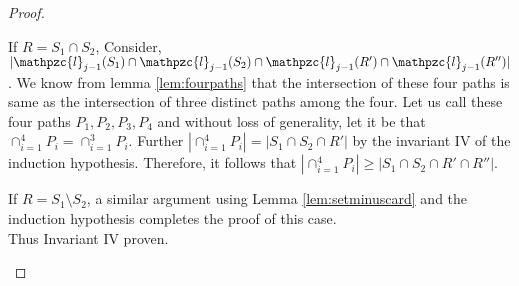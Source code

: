 \documentclass[a4paper,UKenglish,numberwithinsect]{lipics}
\def\cl{\mathpzc{l}}
\begin{document}
\begin{proof}
\begin{enumerate}
\begin{enumerate}
         If $R = S_1 \cap S_2$, Consider, $|\cl_{j-1}(S_1) \cap \cl_{j-1}(S_2) \cap \cl_{j-1}(R') \cap \cl_{j-1}(R'')|$. We know from lemma \ref{lem:fourpaths} that the intersection
of these four paths is same as the intersection of three distinct paths among the four.  
Let us call these four paths $P_1,P_2, P_3,P_4$ and without loss of generality, 
let it be that $\displaystyle \cap_{i=1}^4 P_i  = \cap_{i=1}^3 P_i$. Further $|\cap_{i=1}^4 P_i|=| S_1 \cap S_2 \cap R'|$ by the invariant IV of the induction hypothesis.  
Therefore, it follows that $|\cap_{i=1}^4 P_i| \geq |S_1 \cap S_2 \cap R' \cap R''|$.\\
\begin{comment}
 Next, we write $\displaystyle |\cap_{i=1}^4 P_i| = |P_4| + |\displaystyle \cap_{i=1}^3 P_i| - |P_4 \cup \cap_{i=1}^3 P_i|$. Clearly $\displaystyle P_4 \cup \cap_{i=1}^3 P_i = P_4$.  By
 induction hypothesis Invariant I and IV, We can now write 
$\displaystyle |\cap_{i=1}^4 P_i| = |S_4| + |\cap_{i=1}^3 S_i| - |S_4|$.  
Since $\cl_{j-1}$ is an ICPPL in which $S_4$ is mapped to
$P_4$, and $P_4$ contains $\displaystyle \cap_{i=1}^3 P_i$, it follows that 
$|S_4|=|P_4| \geq|\cap_{i=1}^3 P_i| = |S_1 \cap S_2 \cap R'| \geq |S_1 \cap S_2 \cap R' \cap R''|$.  
Therefore, $\displaystyle |\cap_{i=1}^4 P_i| \leq |S_1 \cap S_2 \cap R' \cap R''|$, 
and equality of these two terms follows because we have also proved the inequality in the
opposite direction. It now follows that$|\cl_j(R) \cap \cl_j(R') \cap \cl_j(R'')|=|\cl_{j-1}(S_1) \cap \cl_{j-1}(S_2) \cap \cl_{j-1}(R') \cap \cl_{j-1}(R'')| = |\cap_{i=1}^4 P_i| = |S_1 \cap S_2 \cap R' \cap R''|= |R \cap R' \cap R''|$. This completes induction hypothesis in this case. \\
\end{comment}
      If $R = S_1 \setminus S_2$, a similar argument using Lemma \ref{lem:setminuscard} and the induction hypothesis completes the proof of this case.\\
      Thus Invariant IV proven.
      \end{enumerate}
  \end{enumerate}
\end{proof}

\end{document}
